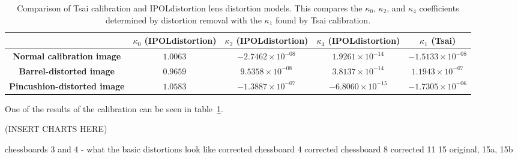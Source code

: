 \begin{table}[htb]
  \centering
  \begin{tabular}{c c c c c c c c c c}
    \toprule
    \multicolumn{2}{c}{\textbf{ }} &
    \multicolumn{2}{c}{\textbf{$\kappa_{0}$ (IPOLdistortion)}} &
    \multicolumn{2}{c}{\textbf{$\kappa_{2}$ (IPOLdistortion)}} &
    \multicolumn{2}{c}{\textbf{$\kappa_{4}$ (IPOLdistortion)}} &
    \multicolumn{2}{c}{\textbf{$\kappa_{1}$ (Tsai)}}\\
    \midrule
    \multicolumn{2}{c}{\textbf{Normal calibration image}} &
    \multicolumn{2}{c}{$1.0063$} &
    \multicolumn{2}{c}{$-2.7462 \times 10^{-08}$} &
    \multicolumn{2}{c}{$1.9261 \times 10^{-14}$} &
    \multicolumn{2}{c}{$-1.5133 \times 10^{-08}$} \\
    \midrule
    \multicolumn{2}{c}{\textbf{Barrel-distorted image}} &
    \multicolumn{2}{c}{$0.9659$} &
    \multicolumn{2}{c}{$9.5358 \times 10^{-08}$} &
    \multicolumn{2}{c}{$3.8137 \times 10^{-14}$} &
    \multicolumn{2}{c}{$1.1943 \times 10^{-07}$} \\
    \midrule
    \multicolumn{2}{c}{\textbf{Pincushion-distorted image}} &
    \multicolumn{2}{c}{$1.0583$} &
    \multicolumn{2}{c}{$-1.3887 \times 10^{-07}$} &
    \multicolumn{2}{c}{$-6.8060 \times 10^{-15}$} &
    \multicolumn{2}{c}{$-1.7305 \times 10^{-06}$} \\
    \bottomrule
  \end{tabular}
  \caption[Comparison of Tsai calibration and IPOLdistortion lens distortion models]{Comparison of Tsai calibration and IPOLdistortion lens distortion models. This compares the $\kappa_{0}$, $\kappa_{2}$, and $\kappa_{4}$ coefficients determined by distortion removal with the $\kappa_{1}$ found by Tsai calibration.}
  \label{tbl:calib-distort-compare}
\end{table}

One of the results of the calibration can be seen in
table~\ref{tbl:calib-distort-compare}.


(INSERT CHARTS HERE)


chessboards 3 and 4 - what the basic distortions look like
corrected chessboard 4
corrected chessboard 8
corrected 11
15 original, 15a, 15b

